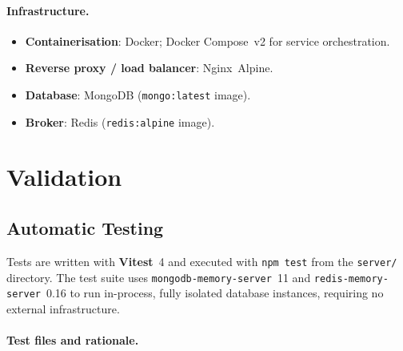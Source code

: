 \documentclass{scrartcl}
\begin{document}
  \paragraph{Infrastructure.}
  \begin{itemize}
    \item \textbf{Containerisation}: Docker; Docker Compose~v2 for service orchestration.
    \item \textbf{Reverse proxy / load balancer}: Nginx~Alpine.
    \item \textbf{Database}: MongoDB (\texttt{mongo:latest} image).
    \item \textbf{Broker}: Redis (\texttt{redis:alpine} image).
  \end{itemize}

  \section{Validation}\label{validation}

  \subsection{Automatic Testing}\label{automatic-testing}

  Tests are written with \textbf{Vitest}~4 and executed with \texttt{npm test} from the
  \texttt{server/} directory. The test suite uses \texttt{mongodb-memory-server}~11 and
  \texttt{redis-memory-server}~0.16 to run in-process, fully isolated database instances,
  requiring no external infrastructure.

  \paragraph{Test files and rationale.}
\end{document}

